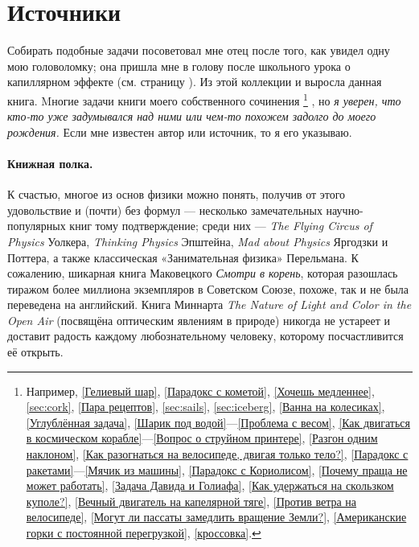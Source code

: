 \section{Источники}

Собирать подобные задачи посоветовал мне отец после того, как увидел одну мою головоломку;
она пришла мне в голову после школьного урока о капиллярном эффекте (см. страницу \pageref{Вечный двигатель на капелярной тяге}).
Из этой коллекции и выросла данная книга.
Mногие задачи книги моего собственного сочинения%
\footnote{Например,
\ref{Гелиевый шар}, \ref{Парадокс с кометой}, \ref{Хочешь медленнее},
\ref{sec:cork}, \ref{Пара рецептов}, \ref{sec:sails}, \ref{sec:iceberg},
\ref{Ванна на колесиках}, \ref{Углублённая задача}, \ref{Шарик под водой}---\ref{Проблема с весом},
\ref{Как двигаться в космическом корабле}---\ref{Вопрос о струйном принтере},
\ref{Разгон одним наклоном}, \ref{Как разогнаться на велосипеде, двигая только тело?}, \ref{Парадокс с ракетами}---\ref{Мячик из машины},
\ref{Парадокс с Кориолисом}, \ref{Почему праща не может работать}, \ref{Задача Давида и Голиафа},
\ref{Как удержаться на скользком куполе?},
\ref{Вечный двигатель на капелярной тяге},
\ref{Против ветра на велосипеде},
\ref{Могут ли пассаты замедлить вращение Земли?},
\ref{Американские горки с постоянной перегрузкой}, \ref{кроссовка}.}%
, но \emph{я уверен, что кто-то уже задумывался над ними или чем-то похожем задолго до моего рождения.}
Если мне известен автор или источник, то я его указываю.

\paragraph{Книжная полка.}
К счастью, %
многое из основ физики можно понять, получив от этого удовольствие и (почти) без формул ---
несколько замечательных научно-популярных книг тому подтверждение;
среди них --- \emph{The Flying Circus of Physics} Уолкера,
\emph{Thinking Physics} Эпштейна,
\emph{Mad about Physics} Яргодзки и Поттера,
а также классическая «Занимательная физика» Перельмана.
К сожалению, шикарная книга Маковецкого \emph{Смотри в корень}, которая разошлась тиражом более миллиона экземпляров в Советском Союзе, похоже, так и не была переведена на английский.
Книга Миннарта \emph{The Nature of Light and Color in the Open Air} (посвящёна оптическим явлениям в природе) никогда не устареет и доставит радость каждому любознательному человеку, которому посчастливится её открыть.
